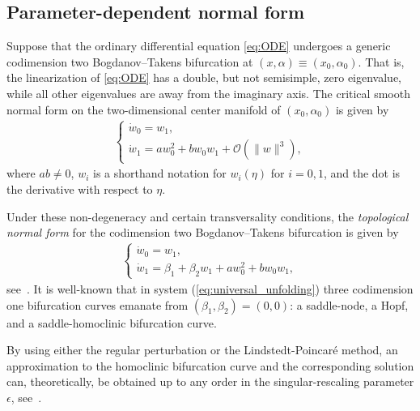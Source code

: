 \subsection{Parameter-dependent normal form}%
%
Suppose that the ordinary differential equation \cref{eq:ODE} undergoes a
generic codimension two Bogdanov--Takens bifurcation at $(x,\alpha) \equiv
(x_0,\alpha_0)$. That is, the linearization of \cref{eq:ODE} has a double, but
not semisimple, zero eigenvalue, while all other eigenvalues are away from the
imaginary axis. The critical smooth normal form on the two-dimensional center
manifold of $(x_0, \alpha_0)$ is given
by~\cite{Arnold_1983,guckenheimer1983nonlinear}
\begin{equation*}
\begin{aligned}
\begin{cases}
\dot w_0 = w_1, \\
\dot w_1 = a w_0^2 + b w_0 w_1 + \mathcal O(\|w\|^3),
\end{cases}
\end{aligned}
\end{equation*}
where $ab \neq 0$, $w_i$ is a shorthand notation for $w_i(\eta)$ for $i=0,1$, and the dot is
the derivative with respect to $\eta$.

Under these non-degeneracy and certain transversality conditions, the
\emph{topological normal form} for the codimension two Bogdanov--Takens
bifurcation is given by  
\begin{equation}
\label{eq:universal_unfolding}
\begin{aligned}
\begin{cases}
\dot w_0 = w_1, \\
\dot w_1 = \beta_1 + \beta_2 w_1 + a w_0^2 + b w_0 w_1,
\end{cases}
\end{aligned}
\end{equation}
see~\cite{bogdanov1975zeroEigenvalues,Bogdanov1976,Takens1974,guckenheimer1983nonlinear,Kuznetsov2004}. 
It is well-known that in system (\ref{eq:universal_unfolding}) three codimension one
bifurcation curves emanate from $(\beta_1,\beta_2)=(0,0)$: a saddle-node, a Hopf,
and a saddle-homoclinic bifurcation curve. 

By using either the regular perturbation or the Lindstedt-Poincar\'e method,
an approximation to the homoclinic bifurcation curve and the corresponding
solution can, theoretically, be obtained up to any order in the
singular-rescaling parameter $\epsilon$,
see~\cite{Kuznetsov2014improved,Gray-Scott2015, Al-Hdaibat2016, Algaba_2019}.

